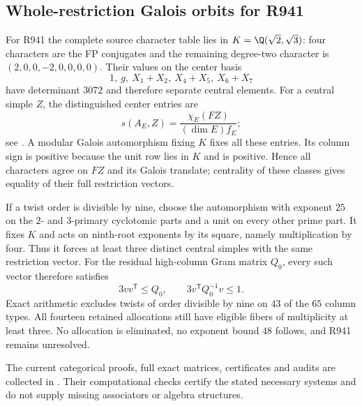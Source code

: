 \subsection{Whole-restriction Galois orbits for R941}
For R941 the complete source character table lies in
$K=\Q(\sqrt2,\sqrt3)$: four characters are the FP conjugates and the
remaining degree-two character is $(2,0,0,-2,0,0,0,0)$. Their values on
the center basis
\[
 1,\ g,\ X_1+X_2,\ X_4+X_5,\ X_6+X_7
\]
have determinant $3072$ and therefore separate central elements.
For a central simple $Z$, the distinguished center entries are
\[
 s(A_E,Z)=\frac{\chi_E(FZ)}{(\dim E)f_E};
\]
see \cite{DeshpandeCenter}. A modular Galois automorphism fixing $K$
fixes all these entries. Its column sign is positive because the unit
row lies in $K$ and is positive. Hence all characters agree on
$FZ$ and its Galois translate; centrality of these classes gives equality
of their full restriction vectors.

If a twist order is divisible by nine, choose the automorphism with
exponent $25$ on the $2$- and $3$-primary cyclotomic parts and a unit on
every other prime part. It fixes $K$ and acts on ninth-root exponents by
its square, namely multiplication by four. Thus it forces at least
three distinct central simples with the same restriction vector.
For the residual high-column Gram matrix $Q_0$, every such vector
therefore satisfies
\[
 3vv^{\mathsf T}\le Q_0,\qquad
 3v^{\mathsf T}Q_0^{-1}v\le1.
\]
Exact arithmetic excludes twists of order divisible by nine on $43$ of
the $65$ column types. All fourteen retained allocations still have
eligible fibers of multiplicity at least three. No allocation is
eliminated, no exponent bound $48$ follows, and R941 remains unresolved.

The current categorical proofs, full exact matrices, certificates and
audits are collected in . Their
computational checks certify the stated necessary systems and do not
supply missing associators or algebra structures.

